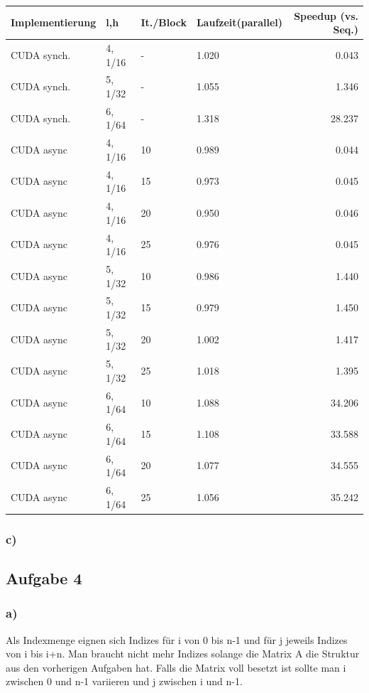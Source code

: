 \documentclass{report}
\begin{document}
	\begin{tabular}{|l|l|l|l|r|}
		\hline
		Implementierung & l,h & It./Block & Laufzeit(parallel) & Speedup (vs. Seq.)\\

		\hline
		CUDA synch. & 4, 1/16 & - & 1.020 & 0.043 \\
		\hline
		CUDA synch. & 5, 1/32 & - & 1.055 & 1.346 \\
		\hline
		CUDA synch. & 6, 1/64 & - & 1.318 & 28.237 \\
		\hline
		CUDA async & 4, 1/16 & 10 & 0.989 & 0.044 \\
		\hline
		CUDA async & 4, 1/16 & 15 & 0.973 & 0.045 \\
		\hline
		CUDA async & 4, 1/16 & 20 & 0.950 & 0.046 \\
		\hline
		CUDA async & 4, 1/16 & 25 & 0.976 & 0.045 \\
		\hline
		CUDA async & 5, 1/32 & 10 & 0.986 & 1.440 \\
		\hline
		CUDA async & 5, 1/32 & 15 & 0.979 & 1.450 \\
		\hline
		CUDA async & 5, 1/32 & 20 & 1.002 & 1.417 \\
		\hline
		CUDA async & 5, 1/32 & 25 & 1.018 & 1.395 \\
		\hline
		CUDA async & 6, 1/64 & 10 & 1.088 & 34.206 \\
		\hline
		CUDA async & 6, 1/64 & 15 & 1.108 & 33.588 \\
		\hline
		CUDA async & 6, 1/64 & 20 & 1.077 & 34.555 \\
		\hline
		CUDA async & 6, 1/64 & 25 & 1.056 & 35.242 \\

		\hline 
	\end{tabular}


\subsubsection{c)}

\subsection{Aufgabe 4}

\subsubsection{a)}
Als Indexmenge eignen sich Indizes für i von 0 bis n-1 und für j jeweils Indizes von i bis i+n. Man braucht nicht mehr Indizes solange die Matrix A die Struktur aus den vorherigen Aufgaben hat. Falls die Matrix voll besetzt ist sollte man i zwischen 0 und n-1 variieren und j zwischen i und n-1.
\end{document}
